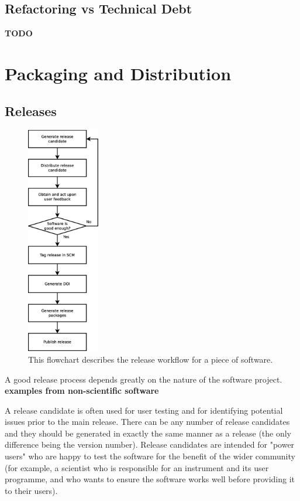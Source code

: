 \documentclass[jnr]{iosart2x}
\newcommand{\todo}[1]{\textbf{#1}}
\begin{document}
\subsection{Refactoring vs Technical Debt}
\label{Refactoring}

\todo{TODO}

\section{Packaging and Distribution}
\label{Packaging and Distribution}

\subsection{Releases}
\label{Releases}

\begin{figure}
    \centering
    \includegraphics[height=10cm]{release_workflow.eps}
    \caption{This flowchart describes the release workflow for a piece of software.}
    \label{Release_Flowchart}
\end{figure}

A good release process depends greatly on the nature of the software project.
\todo{examples from non-scientific software}

A release candidate is often used for user testing and for identifying potential issues prior to the main release.
There can be any number of release candidates and they should be generated in exactly the same manner as a release (the only difference being the version number).
Release candidates are intended for "power users" who are happy to test the software for the benefit of the wider community (for example, a scientist who is responsible for an instrument and its user programme, and who wants to ensure the software works well before providing it to their users).
\end{document}
